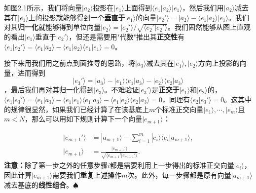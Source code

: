 \documentclass[mathserif,hyperref,UTF8,openany,b5paper]{ctexbook}
\begin{document}
如图2.1所示，我们将向量$|a_2\rangle$投影在$|e_1\rangle$上面得到$\langle e_1|a_2\rangle |e_1\rangle$，然后我们用$|a_2\rangle$减去其在$|e_1\rangle$上的投影就能够得到一个\textbf{垂直于}$|e_1\rangle$的向量$|e_2'\rangle=|a_2\rangle-\langle e_1|a_2\rangle |e_1\rangle$。我们对其\textbf{归一化}就能够得到单位向量$|e_2\rangle = |e_2'\rangle/\sqrt{\langle e_2'|e_2'\rangle}$。我们固然能够从图上直观的看出$|e_1\rangle$垂直于$|e_2'\rangle$，但还是需要用"代数"推出其\textbf{正交性}有$\langle e_1|e_2'\rangle=\langle e_1|a_2\rangle-\langle e_1|a_2\rangle \langle e_1|e_1\rangle = 0$。

接下来用我们用之前点到面推导的思路，将$|a_3\rangle$减去其在$|e_1\rangle,|e_2\rangle$方向上投影的向量，进而得到
\begin{equation}
|e_3'\rangle = |a_3\rangle-|e_1\rangle\langle e_1|a_3\rangle-|e_2\rangle\langle e_2|a_3\rangle
\end{equation}
，最后我们再对其归一化得到$|e_3\rangle$。不难验证$|e_3'\rangle$是\textbf{正交于}$|e_1\rangle$和$|e_2\rangle$的，$\langle e_1|e_3'\rangle = \langle e_1|a_3\rangle - \langle e_1|e_1\rangle \langle e_1|a_3\rangle - \langle e_1|e_2\rangle \langle e_2|a_3\rangle = 0$，同理有$\langle e_2|e_3'\rangle = 0$。这其中的规律很显然，如果我们已经计算了在该基底上$m$个标准正交向量$|e_1\rangle,\cdots,|e_m\rangle$且$m<N$，那么可以用如下规则计算下一个向量$|e_{m+1}\rangle$：

\begin{align}
|e_{m+1}'\rangle &= |a_{m+1}\rangle - \sum^m_{i=1}|e_i\rangle\langle e_i|a_{m+1}\rangle,\\
|e_{m+1}\rangle &= \frac{|e_{m+1}'\rangle}{\sqrt{\langle e_{m+1}'|e_{m+1}'\rangle}}.
\end{align}\textbf{注意：}除了第一步之外的任意步骤$i$都是需要利用上一步得出的标准正交向量$|e_i\rangle$，因此计算$|e_{m+1}\rangle$需要我们\textbf{重复}上述操作$m$次。此外，每一步骤都是原有向量$|a_{m+1}\rangle$减去基底的\textbf{线性组合}。$\spadesuit$
\end{document}
